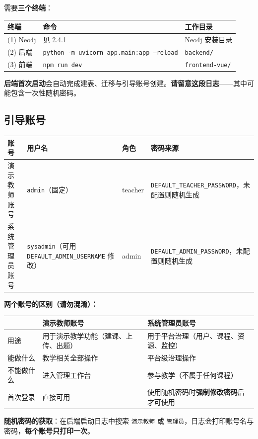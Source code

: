 \documentclass[UTF8,a4paper,11pt]{ctexrep}
\begin{document}
需要\textbf{三个终端}：

\begin{center}
\small
\begin{tabularx}{\linewidth}{@{}XXX@{}}
\toprule
终端 & 命令 & 工作目录 \\
\midrule
(1) Neo4j & 见 2.4.1 & Neo4j 安装目录 \\
(2) 后端 & \texttt{python -m uvicorn app.main:app --reload} & \texttt{backend/} \\
(3) 前端 & \texttt{npm run dev} & \texttt{frontend-vue/} \\
\bottomrule
\end{tabularx}
\end{center}
\textbf{后端首次启动}会自动完成建表、迁移与引导账号创建。\textbf{请留意这段日志}——其中可能包含一次性随机密码。


\subsection{引导账号}

\begin{center}
\small
\begin{tabularx}{\linewidth}{@{}XXXX@{}}
\toprule
账号 & 用户名 & 角色 & 密码来源 \\
\midrule
演示教师账号 & \texttt{admin}（固定） & teacher & \texttt{DEFAULT\_TEACHER\_PASSWORD}，未配置则随机生成 \\
系统管理员账号 & \texttt{sysadmin}（可用 \texttt{DEFAULT\_ADMIN\_USERNAME} 修改） & admin & \texttt{DEFAULT\_ADMIN\_PASSWORD}，未配置则随机生成 \\
\bottomrule
\end{tabularx}
\end{center}
\textbf{两个账号的区别（请勿混淆）：}

\begin{center}
\small
\begin{tabularx}{\linewidth}{@{}XXX@{}}
\toprule
 & 演示教师账号 & 系统管理员账号 \\
\midrule
用途 & 用于演示教学功能（建课、上传、出题） & 用于平台治理（用户、课程、资源、监控） \\
能做什么 & 教学相关全部操作 & 平台级治理操作 \\
不能做什么 & 进入管理工作台 & 参与教学（不属于任何课程） \\
首次登录 & 直接可用 & 使用随机密码时\textbf{强制修改密码}后才可使用 \\
\bottomrule
\end{tabularx}
\end{center}
\textbf{随机密码的获取}：在后端启动日志中搜索 \texttt{演示教师} 或 \texttt{管理员}，日志会打印账号名与密码，\textbf{每个账号只打印一次}。
\end{document}
